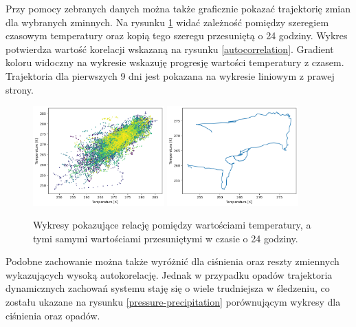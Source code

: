 Przy pomocy zebranych danych można także graficznie pokazać trajektorię zmian dla wybranych zminnych. Na rysunku \ref{temperature} widać zależność pomiędzy szeregiem czasowym temperatury
oraz kopią tego szeregu przesuniętą o 24 godziny. Wykres potwierdza wartość korelacji 
wskazaną na rysunku \ref{autocorrelation}. Gradient koloru widoczny na wykresie wskazuję
progresję wartości temperatury z czasem. Trajektoria dla pierwszych 9 dni jest pokazana 
na wykresie liniowym z prawej strony. 

\begin{figure}[H]
    \centering
    \includegraphics[width=0.45\textwidth]{images/temperature_scatter.png}
    \includegraphics[width=0.45\textwidth]{images/temperature_line.png}
    \caption{Wykresy pokazujące relację pomiędzy wartościami temperatury, a tymi samymi 
    wartościami przesuniętymi w czasie o 24 godziny.}
    \label{temperature}
\end{figure}

Podobne zachowanie można także wyróżnić dla ciśnienia oraz reszty zmiennych wykazujących 
wysoką autokorelację. Jednak w przypadku opadów trajektoria dynamicznych zachowań systemu
staję się o wiele trudniejsza w śledzeniu, co zostału ukazane na rysunku \ref{pressure-precipitation} porównującym wykresy dla ciśnienia oraz opadów. 


